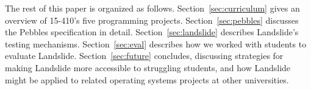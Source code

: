 
The rest of this paper is organized as follows.
Section~\ref{sec:curriculum} gives an overview of 15-410's five programming projects.
Section~\ref{sec:pebbles} discusses the Pebbles specification in detail.
Section~\ref{sec:landslide} describes Landslide's testing mechanisms.
Section~\ref{sec:eval} describes how we worked with students to evaluate Landslide.
Section~\ref{sec:future} concludes, discussing strategies for making Landslide more accessible to struggling students, and how Landslide might be applied to related operating systems projects at other universities.
